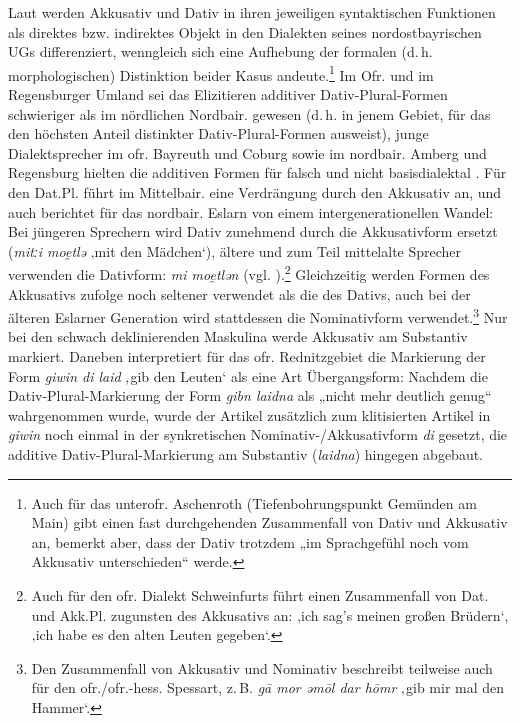 Laut \citet[91]{Rowley1997} werden Akkusativ und Dativ in ihren jeweiligen syntaktischen Funktionen als direktes bzw. indirektes Objekt in den Dialekten seines nordostbayrischen UGs differenziert, wenngleich sich eine Aufhebung der formalen (d.\,h. morphologischen) Distinktion beider Kasus andeute.\footnote{Auch für das unterofr. Aschenroth (Tiefenbohrungspunkt Gemünden am Main) gibt \citet[16]{Köhler1934} einen fast durchgehenden Zusammenfall von Dativ und Akkusativ an, bemerkt aber, dass der Dativ trotzdem „im Sprachgefühl noch vom Akkusativ unterschieden“ werde.}  Im Ofr. und im Regensburger Umland sei das Elizitieren additiver Dativ-Plural-Formen schwieriger als im nördlichen Nordbair. gewesen (d.\,h. in jenem Gebiet, für das  den höchsten Anteil distinkter Dativ-Plural-Formen ausweist), junge Dialektsprecher im ofr. Bayreuth und Coburg sowie im nordbair. Amberg und Regensburg hielten die additiven Formen für falsch und nicht basisdialektal \citep[95]{Rowley1997}. Für den Dat.Pl. führt \citet[441]{Schirmunski1962} im Mittelbair. eine Verdrängung durch den Akkusativ an, und auch \citet[83]{Bachmann2000} berichtet für das nordbair. Eslarn von einem intergenerationellen Wandel: Bei jüngeren Sprechern wird Dativ zunehmend durch die Akkusativform ersetzt (\textit{mitːi moe̯tlə} ‚mit den Mädchen‘), ältere und zum Teil mittelalte Sprecher verwenden die Dativform: \textit{mi moe̯tlən} (vgl. \citealt[32]{Vogt1930}).\footnote{Auch für den ofr. Dialekt Schweinfurts führt \citet[67]{Kemmeter1924} einen Zusammenfall von Dat. und Akk.Pl. zugunsten des Akkusativs an:      ‚ich sag’s meinen großen Brüdern‘,       ‚ich habe es den alten Leuten gegeben‘.} Gleichzeitig werden Formen des Akkusativs \citet[88]{Bachmann2000} zufolge noch seltener verwendet als die des Dativs, auch bei der älteren Eslarner Generation wird stattdessen die Nominativform verwendet.\footnote{Den Zusammenfall von Akkusativ und Nominativ beschreibt \citet[35]{Hirsch1958} teilweise auch für den ofr./ofr.-hess. Spessart, z.\,B. \textit{gā mor əmōl dar hōmr} ‚gib mir mal den Hammer‘.} Nur bei den schwach deklinierenden Maskulina werde Akkusativ am Substantiv markiert. Daneben interpretiert \citet[§51]{Hain1936} für das ofr. Rednitzgebiet die Markierung der Form \textit{giwin di laid} ‚gib den Leuten‘ als eine Art Übergangsform: Nachdem die Dativ-Plural-Markierung der Form \textit{gibn laidna} als „nicht mehr deutlich genug“ wahrgenommen wurde, wurde der Artikel zusätzlich zum klitisierten Artikel in \textit{giwin} noch einmal in der synkretischen Nominativ-/Akkusativform \textit{di} gesetzt, die additive Dativ-Plural-Markierung am Substantiv (\textit{laidna}) hingegen abgebaut.


